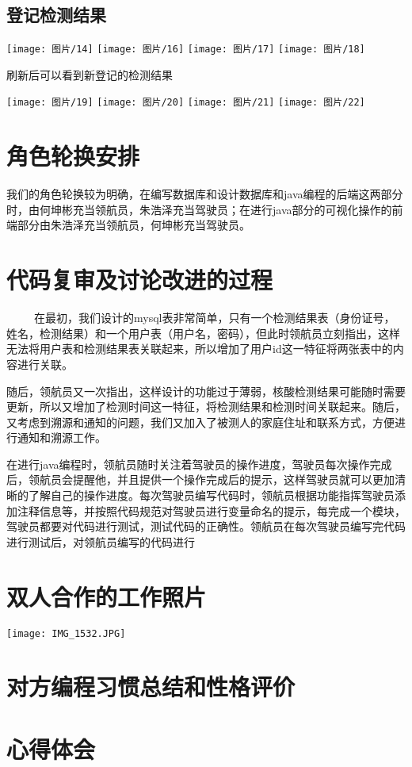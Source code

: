 \documentclass{article}
\begin{document}
\subsection{登记检测结果}
\begin{center}
\texttt{[image: 图片/14]}
\texttt{[image: 图片/16]}
\texttt{[image: 图片/17]}
\texttt{[image: 图片/18]}
\end{center}

刷新后可以看到新登记的检测结果

\begin{center}
\texttt{[image: 图片/19]}
\texttt{[image: 图片/20]}
\texttt{[image: 图片/21]}
\texttt{[image: 图片/22]}
\end{center}
\section{角色轮换安排}
我们的角色轮换较为明确，在编写数据库和设计数据库和java编程的后端这两部分时，由何坤彬充当领航员，朱浩泽充当驾驶员；在进行java部分的可视化操作的前端部分由朱浩泽充当领航员，何坤彬充当驾驶员。
\section{代码复审及讨论改进的过程}
\ \ \ \ \ 在最初，我们设计的mysql表非常简单，只有一个检测结果表（身份证号，姓名，检测结果）和一个用户表（用户名，密码），但此时领航员立刻指出，这样无法将用户表和检测结果表关联起来，所以增加了用户id这一特征将两张表中的内容进行关联。

随后，领航员又一次指出，这样设计的功能过于薄弱，核酸检测结果可能随时需要更新，所以又增加了检测时间这一特征，将检测结果和检测时间关联起来。随后，又考虑到溯源和通知的问题，我们又加入了被测人的家庭住址和联系方式，方便进行通知和溯源工作。

在进行java编程时，领航员随时关注着驾驶员的操作进度，驾驶员每次操作完成后，领航员会提醒他，并且提供一个操作完成后的提示，这样驾驶员就可以更加清晰的了解自己的操作进度。每次驾驶员编写代码时，领航员根据功能指挥驾驶员添加注释信息等，并按照代码规范对驾驶员进行变量命名的提示，每完成一个模块，驾驶员都要对代码进行测试，测试代码的正确性。领航员在每次驾驶员编写完代码进行测试后，对领航员编写的代码进行





\section{双人合作的工作照片}
\centerline{\texttt{[image: IMG\_1532.JPG]}}
\section{对方编程习惯总结和性格评价}
\section{心得体会}
\end{document}
